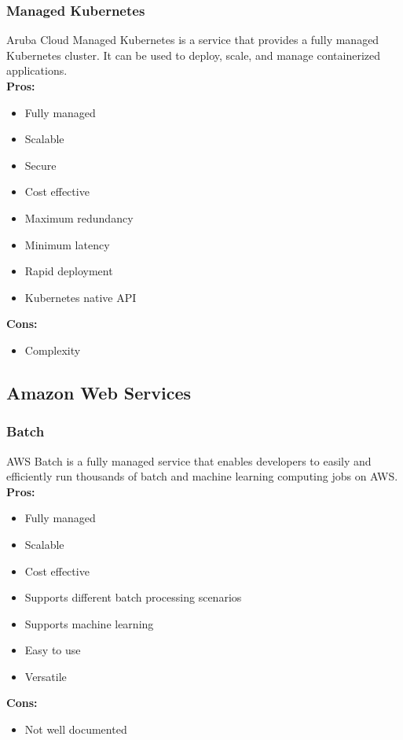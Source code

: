     \subsubsection{Managed Kubernetes}
    \label{aruba-cloud:kubernetes}
    Aruba Cloud Managed Kubernetes is a service that provides a fully managed Kubernetes cluster. It can be used to deploy, scale, and manage containerized applications.\\
    \textbf{Pros:}
    \begin{itemize}
        \item Fully managed
        \item Scalable
        \item Secure
        \item Cost effective
        \item Maximum redundancy
        \item Minimum latency
        \item Rapid deployment
        \item Kubernetes native API
    \end{itemize}
    \textbf{Cons:}
    \begin{itemize}
        \item Complexity
    \end{itemize}


    \subsection{Amazon Web Services}

        \subsubsection{Batch}
        \label{aws:batch}
        AWS Batch is a fully managed service that enables developers to easily and efficiently run thousands of batch and machine learning computing jobs on AWS.\\
        \textbf{Pros:}
        \begin{itemize}
            \item Fully managed
            \item Scalable
            \item Cost effective
            \item Supports different batch processing scenarios
            \item Supports machine learning
            \item Easy to use
            \item Versatile
        \end{itemize}
        \textbf{Cons:}
        \begin{itemize}
            \item Not well documented
        \end{itemize}

